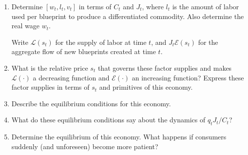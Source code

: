 \documentclass[11pt,english]{article}
\begin{document}
\begin{enumerate}[label = (\alph*)]
    \item Determine $[w_t, l_t, v_t]$ in terms of $C_t$ and $J_t$,
        where $l_t$ is the amount of labor used per blueprint to produce a
        differentiated commodity. Also determine the real wage $w_t$.
 
        Write $\mathcal{L}(s_t)$ for the supply of labor at time $t$, and
        $J_t \mathcal{E}(s_t)$ for the aggregate flow of new blueprints created
        at time $t$.
    \begin{solution}
 
    \end{solution}
 
    \item What is the relative price $s_t$ that governs these
        factor supplies and makes $\mathcal{L}(\cdot)$ a decreasing function and
        $\mathcal{E}(\cdot)$ an increasing function? Express these factor
        supplies in terms of $s_t$ and primitives of this economy.
    \begin{solution}
 
    \end{solution}
 
    \item Describe the equilibrium conditions for this economy.
    \begin{solution}
 
    \end{solution}
 
    \item What do these equilibrium conditions say about the
        dynamics of $q_t J_t / C_t$?
    \begin{solution}
 
    \end{solution}
 
    \item Determine the equilibrium of this economy. What happens
        if consumers suddenly (and unforeseen) become more patient?
    \begin{solution}
 
    \end{solution}
\end{enumerate}
\end{document}
